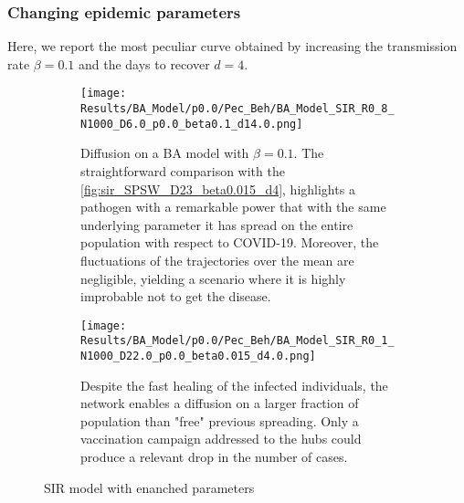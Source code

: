 \documentclass[a4paper,10pt,twoside]{book} %
\theoremstyle{definition}
\begin{document}
\subsubsection{Changing epidemic parameters}
Here, we report the most peculiar curve obtained by increasing the transmission rate $ \beta = 0.1$ and the days to recover $ d = 4$. 
\begin{figure}[H]
	\begin{subfigure}{\linewidth}
		\centering
		\texttt{[image: Results/BA\_Model/p0.0/Pec\_Beh/BA\_Model\_SIR\_R0\_8\_N1000\_D6.0\_p0.0\_beta0.1\_d14.0.png]}
		\caption{Diffusion on a BA model with $\beta = 0.1$. The straightforward comparison with the \autoref{fig:sir_SPSW_D23_beta0.015_d4}, highlights a pathogen with a remarkable power that with the same underlying parameter it has spread on the entire population with respect to COVID-19. Moreover, the fluctuations of the trajectories over the mean are negligible, yielding a scenario where it is highly improbable not to get the disease.}
		\label{fig:sir_BA_D6_b0.1}
	\end{subfigure}
	\par\bigskip
	\begin{subfigure}{\linewidth}
		\centering
		\texttt{[image: Results/BA\_Model/p0.0/Pec\_Beh/BA\_Model\_SIR\_R0\_1\_N1000\_D22.0\_p0.0\_beta0.015\_d4.0.png]}
		\caption{Despite the fast healing of the infected individuals, the network enables a diffusion on a larger fraction of population than "free" previous spreading. Only a vaccination campaign addressed to the hubs could produce a relevant drop in the number of cases.}
		\label{fig:sir_BA_d1D47}
	\end{subfigure}
	\caption{SIR model with enanched parameters}
\end{figure}

\clearpage
\end{document}

